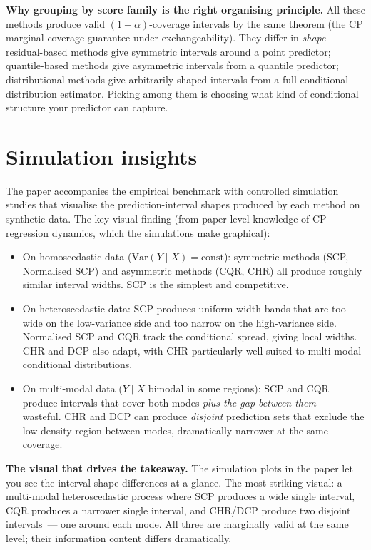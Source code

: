 \documentclass[letterpaper,11pt,leqno]{article}
\begin{document}
\begin{definitionexplain}
\textbf{Why grouping by score family is the right organising principle.} All these methods produce valid $(1-\alpha)$-coverage intervals by the same theorem (the CP marginal-coverage guarantee under exchangeability). They differ in \emph{shape}~--- residual-based methods give symmetric intervals around a point predictor; quantile-based methods give asymmetric intervals from a quantile predictor; distributional methods give arbitrarily shaped intervals from a full conditional-distribution estimator. Picking among them is choosing what kind of conditional structure your predictor can capture.
\end{definitionexplain}

\section{Simulation insights}\label{s:simulation}

The paper accompanies the empirical benchmark with controlled simulation studies that visualise the prediction-interval shapes produced by each method on synthetic data. The key visual finding (from paper-level knowledge of CP regression dynamics, which the simulations make graphical):

\begin{itemize}
\item On homoscedastic data ($\text{Var}(Y \mid X) = \text{const}$): symmetric methods (SCP, Normalised SCP) and asymmetric methods (CQR, CHR) all produce roughly similar interval widths. SCP is the simplest and competitive.
\item On heteroscedastic data: SCP produces uniform-width bands that are too wide on the low-variance side and too narrow on the high-variance side. Normalised SCP and CQR track the conditional spread, giving local widths. CHR and DCP also adapt, with CHR particularly well-suited to multi-modal conditional distributions.
\item On multi-modal data ($Y \mid X$ bimodal in some regions): SCP and CQR produce intervals that cover both modes \emph{plus the gap between them}~--- wasteful. CHR and DCP can produce \emph{disjoint} prediction sets that exclude the low-density region between modes, dramatically narrower at the same coverage.
\end{itemize}

\begin{explain}
\textbf{The visual that drives the takeaway.} The simulation plots in the paper let you see the interval-shape differences at a glance. The most striking visual: a multi-modal heteroscedastic process where SCP produces a wide single interval, CQR produces a narrower single interval, and CHR/DCP produce two disjoint intervals~--- one around each mode. All three are marginally valid at the same level; their information content differs dramatically.
\end{explain}
\end{document}
